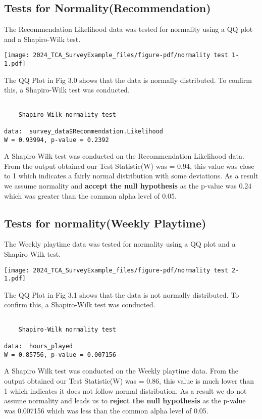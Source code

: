 \documentclass[
  letterpaper,
  DIV=11,
  numbers=noendperiod]{scrartcl}
\begin{document}
\subsection{Tests for
Normality(Recommendation)}\label{tests-for-normalityrecommendation}

The Recommendation Likelihood data was tested for normality using a QQ
plot and a Shapiro-Wilk test.

\texttt{[image: 2024\_TCA\_SurveyExample\_files/figure-pdf/normality test 1-1.pdf]}

The QQ Plot in Fig 3.0 shows that the data is normally distributed. To
confirm this, a Shapiro-Wilk test was conducted.

\begin{verbatim}

    Shapiro-Wilk normality test

data:  survey_data$Recommendation.Likelihood
W = 0.93994, p-value = 0.2392
\end{verbatim}

A Shapiro Wilk test was conducted on the Recommendation Likelihood data.
From the output obtained our Test Statistic(W) was = 0.94, this value
was close to 1 which indicates a fairly normal distribution with some
deviations. As a result we assume normality and \textbf{accept the null
hypothesis} as the p-value was 0.24 which was greater than the common
alpha level of 0.05.

\subsection{Tests for normality(Weekly
Playtime)}\label{tests-for-normalityweekly-playtime}

The Weekly playtime data was tested for normality using a QQ plot and a
Shapiro-Wilk test.

\texttt{[image: 2024\_TCA\_SurveyExample\_files/figure-pdf/normality test 2-1.pdf]}

The QQ Plot in Fig 3.1 shows that the data is not normally distributed.
To confirm this, a Shapiro-Wilk test was conducted.

\begin{verbatim}

    Shapiro-Wilk normality test

data:  hours_played
W = 0.85756, p-value = 0.007156
\end{verbatim}

A Shapiro Wilk test was conducted on the Weekly playtime data. From the
output obtained our Test Statistic(W) was = 0.86, this value is much
lower than 1 which indicates it does not follow normal distribution. As
a result we do not assume normality and leads us to \textbf{reject the
null hypothesis} as the p-value was 0.007156 which was less than the
common alpha level of 0.05.
\end{document}
